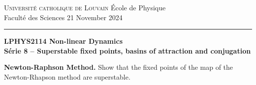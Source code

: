\documentclass{article}
\begin{document}
\noindent
{\textsc{Universit\'e catholique de Louvain}} \hfill \'Ecole de Physique\\
Facult\'e des Sciences \hfill 21 November 2024\\
\hrule

\bigskip

\begin{center}
  \textbf{LPHYS2114 Non-linear Dynamics}\\
  \textbf{S\'erie 8 -- Superstable fixed points, basins of attraction and conjugation} 
\end{center}

{}


\begin{question}
  \textbf{Newton-Raphson Method.} Show that the fixed points of the map of the Newton-Rhapson method are superstable.
\end{question}
\end{document}
